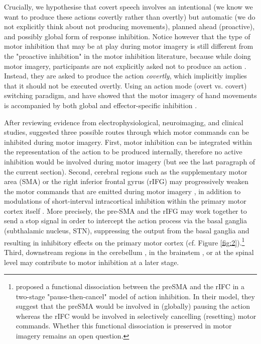 \documentclass[utf8]{template/frontiersSCNS} %
\begin{document}
Crucially, we hypothesise that covert speech involves an intentional (we know we want to produce these actions covertly rather than overtly) but automatic (we do not explicitly think about not producing movements), planned ahead (proactive), and possibly global form of response inhibition. Notice however that the type of motor inhibition that may be at play during motor imagery is still different from the "proactive inhibition" in the motor inhibition literature, because while doing motor imagery, participants are not explicitly asked not to produce an action \citep{guillot_imagining_2012}. Instead, they are asked to produce the action \textit{covertly}, which implicitly implies that it should not be executed overtly. Using an action mode (overt vs. covert) switching paradigm, \cite{rieger_inhibition_2017} and \cite{bart_inhibitory_2021} have showed that the motor imagery of hand movements is accompanied by both global and effector-specific inhibition \citep[these results were also replicated in][]{scheil_motor_2018}.


After reviewing evidence from electrophysiological, neuroimaging, and clinical studies, \cite{guillot_imagining_2012} suggested three possible routes through which motor commands can be inhibited during motor imagery. First, motor inhibition can be integrated within the representation of the action to be produced internally, therefore no active inhibition would be involved during motor imagery (but see the last paragraph of the current section). Second, cerebral regions such as the supplementary motor area (SMA) \citep{kasess_suppressive_2008} or the right inferior frontal gyrus (rIFG) may progressively weaken the motor commands that are emitted during motor imagery \citep[e.g.,][]{angelini_motor_2015, angelini_proactive_2016}, in addition to modulations of short-interval intracortical inhibition within the primary motor cortex itself \citep{neige_unravelling_2020}. More precisely, the pre-SMA and the rIFG may work together to send a stop signal in order to intercept the action process via the basal ganglia (subthalamic nucleus, STN), suppressing the output from the basal ganglia and resulting in inhibitory effects on the primary motor cortex \citep{aron_reactive_2011} (cf. Figure \ref{fig:2}).\footnote{\cite{diesburg_pause-then-cancel_2021} proposed a functional dissociation between the preSMA and the rIFC in a two-stage "pause-then-cancel" model of action inhibition. In their model, they suggest that the preSMA would be involved in (globally) pausing the action whereas the rIFC would be involved in selectively cancelling (resetting) motor commands. Whether this functional dissociation is preserved in motor imagery remains an open question.} Third, downstream regions in the cerebellum \citep[e.g.,][]{lotze_activation_1999}, in the brainstem \citep[e.g.,][]{jeannerod_neural_2001, jeannerod_motor_2006}, or at the spinal level may contribute to motor inhibition at a later stage.
\end{document}
